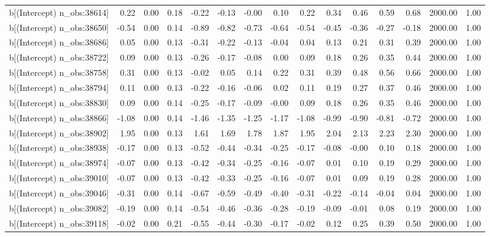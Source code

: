 \begin{table}[ht]
\begin{tabular}{rrrrrrrrrrrrrrr}
  b[(Intercept) n\_obs:38614] & 0.22 & 0.00 & 0.18 & -0.22 & -0.13 & -0.00 & 0.10 & 0.22 & 0.34 & 0.46 & 0.59 & 0.68 & 2000.00 & 1.00 \\ 
  b[(Intercept) n\_obs:38650] & -0.54 & 0.00 & 0.14 & -0.89 & -0.82 & -0.73 & -0.64 & -0.54 & -0.45 & -0.36 & -0.27 & -0.18 & 2000.00 & 1.00 \\ 
  b[(Intercept) n\_obs:38686] & 0.05 & 0.00 & 0.13 & -0.31 & -0.22 & -0.13 & -0.04 & 0.04 & 0.13 & 0.21 & 0.31 & 0.39 & 2000.00 & 1.00 \\ 
  b[(Intercept) n\_obs:38722] & 0.09 & 0.00 & 0.13 & -0.26 & -0.17 & -0.08 & 0.00 & 0.09 & 0.18 & 0.26 & 0.35 & 0.44 & 2000.00 & 1.00 \\ 
  b[(Intercept) n\_obs:38758] & 0.31 & 0.00 & 0.13 & -0.02 & 0.05 & 0.14 & 0.22 & 0.31 & 0.39 & 0.48 & 0.56 & 0.66 & 2000.00 & 1.00 \\ 
  b[(Intercept) n\_obs:38794] & 0.11 & 0.00 & 0.13 & -0.22 & -0.16 & -0.06 & 0.02 & 0.11 & 0.19 & 0.27 & 0.37 & 0.46 & 2000.00 & 1.00 \\ 
  b[(Intercept) n\_obs:38830] & 0.09 & 0.00 & 0.14 & -0.25 & -0.17 & -0.09 & -0.00 & 0.09 & 0.18 & 0.26 & 0.35 & 0.46 & 2000.00 & 1.00 \\ 
  b[(Intercept) n\_obs:38866] & -1.08 & 0.00 & 0.14 & -1.46 & -1.35 & -1.25 & -1.17 & -1.08 & -0.99 & -0.90 & -0.81 & -0.72 & 2000.00 & 1.00 \\ 
  b[(Intercept) n\_obs:38902] & 1.95 & 0.00 & 0.13 & 1.61 & 1.69 & 1.78 & 1.87 & 1.95 & 2.04 & 2.13 & 2.23 & 2.30 & 2000.00 & 1.00 \\ 
  b[(Intercept) n\_obs:38938] & -0.17 & 0.00 & 0.13 & -0.52 & -0.44 & -0.34 & -0.25 & -0.17 & -0.08 & -0.00 & 0.10 & 0.18 & 2000.00 & 1.00 \\ 
  b[(Intercept) n\_obs:38974] & -0.07 & 0.00 & 0.13 & -0.42 & -0.34 & -0.25 & -0.16 & -0.07 & 0.01 & 0.10 & 0.19 & 0.29 & 2000.00 & 1.00 \\ 
  b[(Intercept) n\_obs:39010] & -0.07 & 0.00 & 0.13 & -0.42 & -0.33 & -0.25 & -0.16 & -0.07 & 0.01 & 0.09 & 0.19 & 0.28 & 2000.00 & 1.00 \\ 
  b[(Intercept) n\_obs:39046] & -0.31 & 0.00 & 0.14 & -0.67 & -0.59 & -0.49 & -0.40 & -0.31 & -0.22 & -0.14 & -0.04 & 0.04 & 2000.00 & 1.00 \\ 
  b[(Intercept) n\_obs:39082] & -0.19 & 0.00 & 0.14 & -0.54 & -0.46 & -0.36 & -0.28 & -0.19 & -0.09 & -0.01 & 0.08 & 0.19 & 2000.00 & 1.00 \\ 
  b[(Intercept) n\_obs:39118] & -0.02 & 0.00 & 0.21 & -0.55 & -0.44 & -0.30 & -0.17 & -0.02 & 0.12 & 0.25 & 0.39 & 0.50 & 2000.00 & 1.00 \\ 

\end{tabular}
\end{table}
